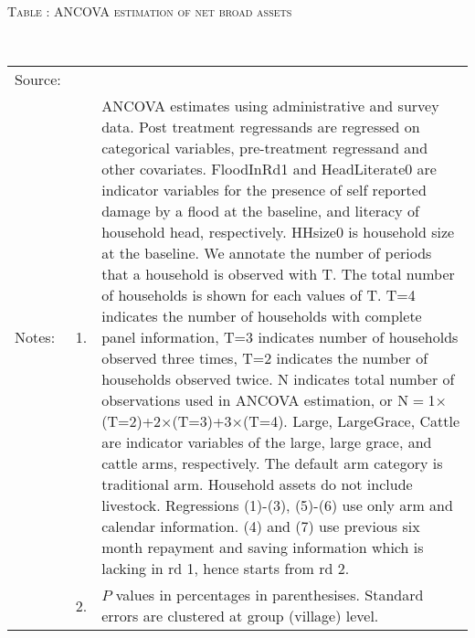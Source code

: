 \hspace{-1cm}\begin{minipage}[t]{14cm}
\hfil\textsc{\normalsize Table \thetable: ANCOVA estimation of net broad assets\label{tab ANCOVA net assets}}\\
\setlength{\tabcolsep}{1pt}
\setlength{\baselineskip}{8pt}
\renewcommand{\arraystretch}{.55}
\hfil{}\\
\renewcommand{\arraystretch}{.8}
\setlength{\tabcolsep}{1pt}
\begin{tabular}{>{\hfill\scriptsize}p{1cm}<{}>{\hfill\scriptsize}p{.25cm}<{}>{\scriptsize}p{12cm}<{\hfill}}
Source:& \multicolumn{2}{l}{\scriptsize Estimated with GUK administrative and survey data.}\\
Notes: & 1. & ANCOVA estimates using administrative and survey data. Post treatment regressands are regressed on categorical variables, pre-treatment regressand and other covariates. \textsf{FloodInRd1} and \textsf{HeadLiterate0} are indicator variables for the presence of self reported damage by a flood at the baseline, and literacy of household head, respectively. \textsf{HHsize0} is household size at the baseline. We annotate the number of periods that a household is observed with \textsf{T}. The total number of households is shown for each values of \textsf{T}. \textsf{T=4} indicates the number of households with complete panel information, \textsf{T=3} indicates number of households observed three times, \textsf{T=2} indicates the number of households observed twice. \textsf{N} indicates total number of observations used in ANCOVA estimation, or \textsf{N$=$1$\times$(T=2)+2$\times$(T=3)+3$\times$(T=4)}.  \textsf{Large}, \textsf{LargeGrace}, \textsf{Cattle} are indicator variables of the \textsf{large}, \textsf{large grace}, and \textsf{cattle} arms, respectively. The default arm category is \textsf{traditional} arm. Household assets do not include livestock. Regressions (1)-(3), (5)-(6) use only arm and calendar information. (4) and (7) use previous six month repayment and saving information which is lacking in rd 1, hence starts from rd 2.\\
& 2. & $P$ values in percentages in parenthesises. Standard errors are clustered at group (village) level.
\end{tabular}
\end{minipage}

